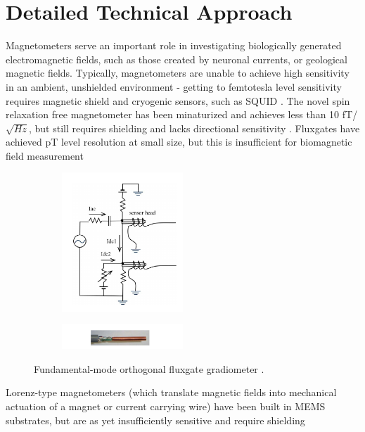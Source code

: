 \section{Detailed Technical Approach}

Magnetometers serve an important role in investigating biologically generated electromagnetic fields, such as those created by neuronal currents, or geological magnetic fields. Typically, magnetometers are unable to achieve high sensitivity in an ambient, unshielded environment - getting to femtotesla level sensitivity requires magnetic shield and cryogenic sensors, such as SQUID \cite{lenz2006magnetic}. The novel spin relaxation free magnetometer has been minaturized and achieves less than 10 fT/$\sqrt{Hz}$, but still requires shielding and lacks directional sensitivity \cite{shah2013compact}. Fluxgates have achieved pT level resolution at small size, but this is insufficient for biomagnetic field measurement \cite{sasada2002orthogonal,uchiyama2014highly,sasada2014fundamental} 

\begin{figure}[h]
  \centering
  \begin{subfigure}
    \centering
    \includegraphics[width=0.5\textwidth]{fmofg}
  \end{subfigure}
  \begin{subfigure}
    \centering
    \includegraphics[width=0.5\textwidth]{fmofg2}
  \end{subfigure}
\caption{Fundamental-mode orthogonal fluxgate gradiometer \cite{sasada2014fundamental}.}
\label{fig:fmofg}
\end{figure}
Lorenz-type magnetometers (which translate magnetic fields into mechanical actuation of a magnet or current carrying wire) have been built in MEMS substrates, but are as yet insufficiently sensitive and require shielding \cite{sinha201627,kyynarainen20083d,kumar2015ultra,thompson2009parametrically}

